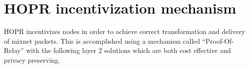 \section{HOPR incentivization mechanism}
HOPR incentivizes nodes in order to achieve correct transformation and delivery of mixnet packets.
This is accomplished using a mechanism called “Proof-Of-Relay” with the following layer 2 solutions which are both cost effective and privacy preserving.






